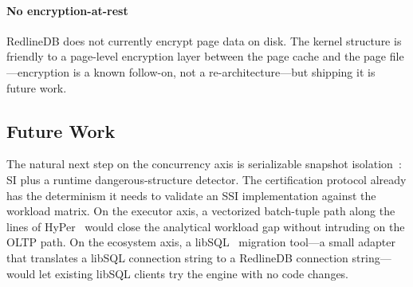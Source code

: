 \paragraph{No encryption-at-rest} RedlineDB does not currently
encrypt page data on disk. The kernel structure is friendly to a
page-level encryption layer between the page cache and the page
file---encryption is a known follow-on, not a re-architecture---but
shipping it is future work.

\subsection{Future Work}
The natural next step on the concurrency axis is serializable
snapshot isolation~\cite{cahill2008ssi}: SI plus a runtime
dangerous-structure detector. The certification protocol already
has the determinism it needs to validate an SSI implementation
against the workload matrix. On the executor axis, a vectorized
batch-tuple path along the lines of
HyPer~\cite{kemper2011hyper,neumann2015fast} would close the
analytical workload gap without intruding on the OLTP path. On the
ecosystem axis, a libSQL~\cite{libsql} migration tool---a small
adapter that translates a libSQL connection string to a RedlineDB
connection string---would let existing libSQL clients try the engine
with no code changes.
